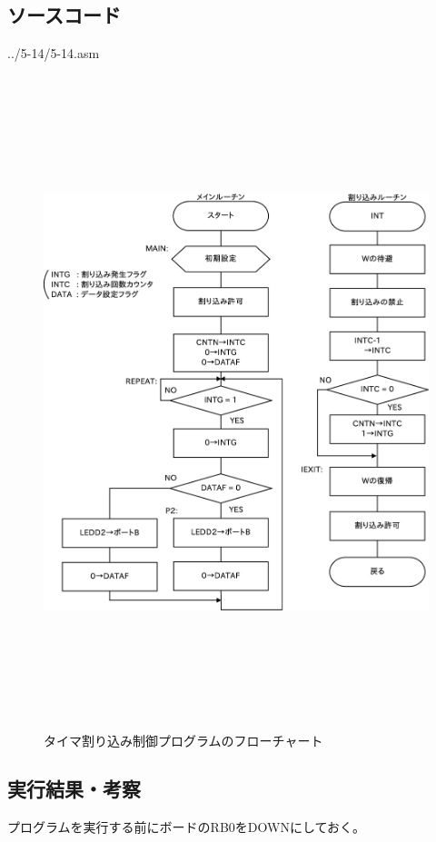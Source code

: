 \documentclass[a4paper,12pt]{ujarticle}
\begin{document}
  \subsection{ソースコード}
  \begin{lstinputlisting}[basicstyle=\ttfamily\footnotesize, frame=single,numbers=left]
   {../5-14/5-14.asm}
  \end{lstinputlisting}
  \begin{figure}[htbp]
    \begin{center}
     \includegraphics[height=190mm]{Diagram5-14.eps}
    \end{center}
   \caption{タイマ割り込み制御プログラムのフローチャート}
   \label{fig:flow_5-14}
  \end{figure}

  \clearpage
  \subsection{実行結果・考察}
  プログラムを実行する前にボードのRB0をDOWNにしておく。
\end{document}
